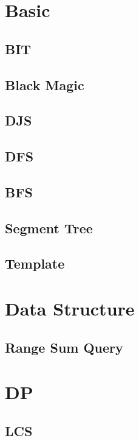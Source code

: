 \section{Basic}
    \subsection{BIT}
        
    \subsection{Black Magic}
        
    \subsection{DJS}
        
    \subsection{DFS}
        
    \subsection{BFS}
        
    \subsection{Segment Tree}
        
    \subsection{Template}
        

\section{Data Structure}
    \subsection{Range Sum Query}
        

\section{DP}
    \subsection{LCS}
        

